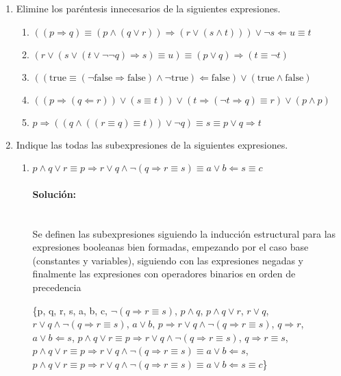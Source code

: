 \documentclass{article}
\newcommand{\myparagraph}[1]{\paragraph{#1}\mbox{}\\}
\begin{document}
\begin{enumerate}
	\item Elimine los paréntesis innecesarios de la siguientes expresiones.

	\begin{enumerate}
		\item $((p \Rightarrow q) \equiv (p \land (q \lor r)) \Rightarrow (r \lor (s \land t))) \lor \neg s \Leftarrow u \equiv t$
		
		\item $(r \lor (s \lor (t \lor \neg \neg q) \Rightarrow s) \equiv u) \equiv (p \lor q) \Rightarrow (t \equiv \neg t)$
		
		\item $((\text{true} \equiv (\neg \text{false} \Rightarrow \text{false}) \land \neg \text{true}) \Leftarrow \text{false}) \lor (\text{true} \land \text{false})$
		
		\item $((p \Rightarrow (q \Leftarrow r)) \lor (s \equiv t)) \lor (t \Rightarrow (\neg t \Rightarrow q) \equiv r) \lor (p \land p)$
		
		\item $p \Rightarrow ((q \land ((r \equiv q) \equiv t)) \lor \neg q) \equiv s \equiv p \lor q \Rightarrow t$
		
	\end{enumerate}

	\item Indique las todas las subexpresiones de la siguientes expresiones.

	\begin{enumerate}
		\item $p \land q \lor r \equiv p \Rightarrow r \lor q \land \neg(q \Rightarrow r \equiv s) \equiv a \lor b \Leftarrow s \equiv c$
		
		
		\myparagraph{Solución:}
		\textlangle{} Se definen las subexpresiones siguiendo la inducción estructural para las expresiones booleanas bien formadas, empezando por el caso base (constantes y variables), siguiendo con las expresiones negadas y finalmente las expresiones con operadores binarios en orden de precedencia \textrangle\par
			\{p, q, r, s, a, b, c, ${\neg(q \Rightarrow r \equiv s)}$, ${p \land q}$, ${p \land q \lor r}$, ${r \lor q}$, $r \lor q \land \neg(q \Rightarrow r \equiv s)$, $a \lor b$, $p \Rightarrow r \lor q \land \neg(q \Rightarrow r \equiv s)$, $q \Rightarrow r$, $a \lor b \Leftarrow s$, $p \land q \lor r \equiv p \Rightarrow r \lor q \land \neg(q \Rightarrow r \equiv s)$, $q \Rightarrow r \equiv s$,  $p \land q \lor r \equiv p \Rightarrow r \lor q \land \neg(q \Rightarrow r \equiv s) \equiv a \lor b \Leftarrow s$, $p \land q \lor r \equiv p \Rightarrow r \lor q \land \neg(q \Rightarrow r \equiv s) \equiv a \lor b \Leftarrow s \equiv c$\}\par
		\hspace{0.8cm}
		


\end{enumerate}
\end{enumerate}
\end{document}
